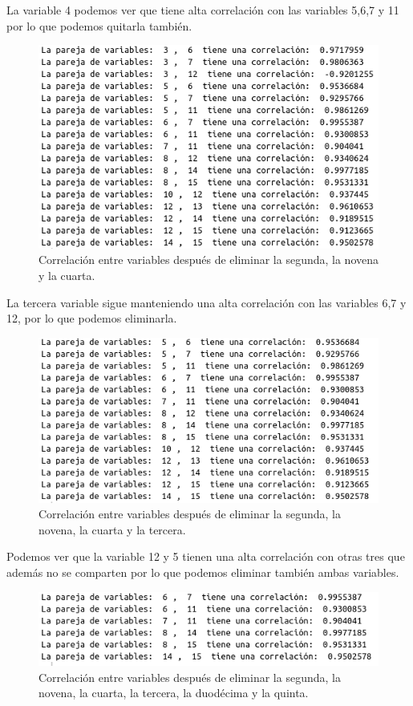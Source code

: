 \documentclass[12pt,a4paper]{article}
\begin{document}
La variable 4 podemos ver que tiene alta correlación con las variables 5,6,7 y 11 por lo que podemos quitarla también.

\begin{figure}[H]
	\centering
	\includegraphics[scale=0.6]{./Imagenes/correlacion_entre_variables4.png}
	\caption{Correlación entre variables después de eliminar la segunda, la novena y la cuarta.}
\end{figure}

La tercera variable sigue manteniendo una alta correlación con las variables 6,7 y 12, por lo que podemos eliminarla.

\begin{figure}[H]
	\centering
	\includegraphics[scale=0.6]{./Imagenes/correlacion_entre_variables5.png}
	\caption{Correlación entre variables después de eliminar la segunda, la novena, la cuarta y la tercera.}
\end{figure}

Podemos ver que la variable 12 y 5 tienen una alta correlación con otras tres que además  no se comparten por lo que podemos eliminar también ambas variables.

\begin{figure}[H]
	\centering
	\includegraphics[scale=0.6]{./Imagenes/correlacion_entre_variables6.png}
	\caption{Correlación entre variables después de eliminar la segunda, la novena, la cuarta, la tercera, la duodécima y la quinta.}
\end{figure}
\end{document}
